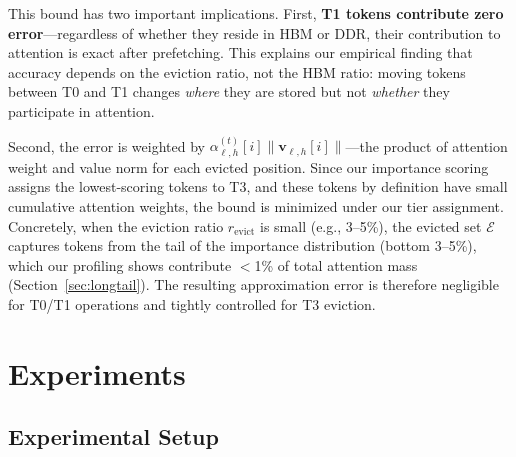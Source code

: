 \documentclass{article}
\begin{document}
This bound has two important implications.
First, \textbf{T1 tokens contribute zero error}---regardless of whether they reside in HBM or DDR, their contribution to attention is exact after prefetching.
This explains our empirical finding that accuracy depends on the eviction ratio, not the HBM ratio: moving tokens between T0 and T1 changes \emph{where} they are stored but not \emph{whether} they participate in attention.

Second, the error is weighted by $\alpha_{\ell,h}^{(t)}[i] \|\mathbf{v}_{\ell,h}[i]\|$---the product of attention weight and value norm for each evicted position.
Since our importance scoring assigns the lowest-scoring tokens to T3, and these tokens by definition have small cumulative attention weights, the bound is minimized under our tier assignment.
Concretely, when the eviction ratio $r_\text{evict}$ is small (e.g., 3--5\%), the evicted set $\mathcal{E}$ captures tokens from the tail of the importance distribution (bottom 3--5\%), which our profiling shows contribute $<$1\% of total attention mass (Section~\ref{sec:longtail}).
The resulting approximation error is therefore negligible for T0/T1 operations and tightly controlled for T3 eviction.


\section{Experiments}
\label{sec:experiments}

\subsection{Experimental Setup}
\end{document}
